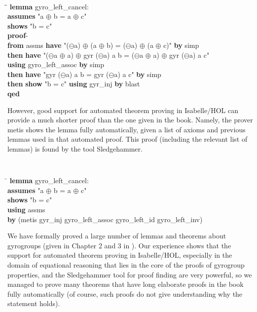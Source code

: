 \documentclass[a4paper]{article}
\theoremstyle{definition}
\begin{document}
\begin{small}
{\tt
\begin{tabbing}
\hspace{5mm}\=\hspace{5mm}\=\kill
{\bf lemma} gyro\_left\_cancel:\\
\>  {\bf assumes} "a $\oplus$ b = a $\oplus$ c"\\
\>  {\bf shows} "b = c"\\
{\bf proof}-\\
\>  {\bf from} assms {\bf have} "($\ominus$a) $\oplus$ (a $\oplus$ b) = ($\ominus$a) $\oplus$ (a $\oplus$ c)" {\bf by} simp\\
\>  {\bf then} {\bf have} "($\ominus$a $\oplus$ a) $\oplus$ gyr ($\ominus$a) a b = ($\ominus$a $\oplus$ a) $\oplus$ gyr ($\ominus$a) a c"\\
\>\>    {\bf using} gyro\_left\_assoc {\bf by} simp\\
\>  {\bf then} {\bf have} "gyr ($\ominus$a) a b = gyr ($\ominus$a) a c" {\bf by} simp\\
\>  {\bf then} {\bf show} "b = c" {\bf using} gyr\_inj {\bf by} blast\\
{\bf qed}
\end{tabbing}
}
\end{small}

However, good support for automated theorem proving in Isabelle/HOL
can provide a much shorter proof than the one given in the
book. Namely, the prover metis shows the lemma fully automatically,
given a list of axioms and previous lemmas used in that automated
proof. This proof (including the relevant list of lemmas) is found by
the tool Sledgehammer\cite{sledgehammer}.

\begin{small}
{\tt
\begin{tabbing}
\hspace{5mm}\=\kill
{\bf lemma} gyro\_left\_cancel:\\
\>  {\bf assumes} "a $\oplus$ b = a $\oplus$ c"\\
\>  {\bf shows} "b = c"\\
{\bf using} assms\\
{\bf by} (metis gyr\_inj gyro\_left\_assoc gyro\_left\_id gyro\_left\_inv)
\end{tabbing}
}
\end{small}

We have formally proved a large number of lemmas and theorems about
gyrogroups (given in Chapter 2 and 3 in \cite{ungar-analytic}). Our
experience shows that the support for automated theorem proving in
Isabelle/HOL, especially in the domain of equational reasoning that
lies in the core of the proofs of gyrogroup properties, and the
Sledgehammer tool for proof finding are very powerful, so we managed
to prove many theorems that have long elaborate proofs in the book
fully automatically (of course, such proofs do not give understanding
why the statement holds).
\end{document}
